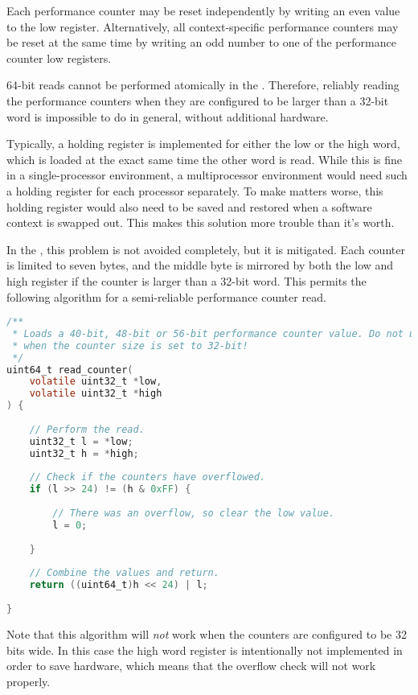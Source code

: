 Each performance counter may be reset independently by writing an even value to
the low register. Alternatively, all context-specific performance counters may
be reset at the same time by writing an odd number to one of the performance
counter low registers.

64-bit reads cannot be performed atomically in the \rvex{}. Therefore, reliably
reading the performance counters when they are configured to be larger than a
32-bit word is impossible to do in general, without additional hardware.

Typically, a holding register is implemented for either the low or the high
word, which is loaded at the exact same time the other word is read. While this
is fine in a single-processor environment, a multiprocessor environment would
need such a holding register for each processor separately. To make matters
worse, this holding register would also need to be saved and restored when a
software context is swapped out. This makes this solution more trouble than it's
worth.

In the \rvex{}, this problem is not avoided completely, but it is mitigated. 
Each counter is limited to seven bytes, and the middle byte is mirrored by both 
the low and high register if the counter is larger than a 32-bit word. This 
permits the following algorithm for a semi-reliable performance counter read.

\begin{lstlisting}[numbers=none, basicstyle=\footnotesize, language=C]
/**
 * Loads a 40-bit, 48-bit or 56-bit performance counter value. Do not use this
 * when the counter size is set to 32-bit!
 */
uint64_t read_counter(
    volatile uint32_t *low,
    volatile uint32_t *high
) {
    
    // Perform the read.
    uint32_t l = *low;
    uint32_t h = *high;
    
    // Check if the counters have overflowed.
    if (l >> 24) != (h & 0xFF) {
        
        // There was an overflow, so clear the low value.
        l = 0;
        
    }
    
    // Combine the values and return.
    return ((uint64_t)h << 24) | l;
    
}
\end{lstlisting}

\noindent Note that this algorithm will \emph{not} work when the counters are
configured to be 32 bits wide. In this case the high word register is
intentionally not implemented in order to save hardware, which means that the
overflow check will not work properly.

